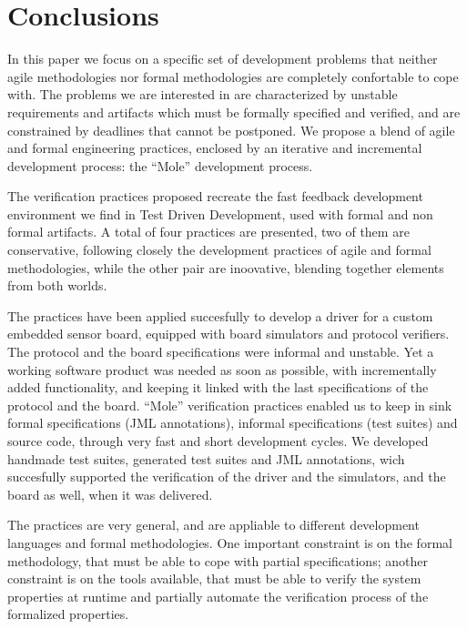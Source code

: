 \documentclass{article}
\begin{document}
\section{Conclusions}
\label{sec:conclusions}

In this paper we focus on a specific set of development problems that neither agile methodologies nor formal methodologies are completely confortable to cope with.
The problems we are interested in are characterized by unstable requirements and artifacts which must be formally specified and verified, and are constrained by deadlines that cannot be postponed.
We propose a blend of agile and formal engineering practices, enclosed by an iterative and incremental development process: the ``Mole'' development process.

The verification practices proposed recreate the fast feedback development environment we find in Test Driven Development, used with formal and non formal artifacts.
A total of four practices are presented, two of them are conservative, following closely the development practices of agile and formal methodologies, while the other pair are inoovative, blending together elements from both worlds.

The practices have been applied succesfully to develop a driver for a custom embedded sensor board, equipped with board simulators and protocol verifiers. 
The protocol and the board specifications were informal and unstable. 
Yet a working software product was needed as soon as possible, with incrementally added functionality, and keeping it linked with the last specifications of the protocol and the board.
``Mole'' verification practices enabled us to keep in sink formal specifications (JML annotations), informal specifications (test suites) and source code, through very fast and short development cycles.
We developed handmade test suites, generated test suites and JML annotations, wich succesfully supported the verification of the driver and the simulators, and the board as well, when it was delivered.

The practices are very general, and are appliable to different development languages and formal methodologies.
One important constraint is on the formal methodology, that must be able to cope with partial specifications; another constraint is on the tools available, that must be able to verify the system properties at runtime and partially automate the verification process of the formalized properties.




\end{document}
